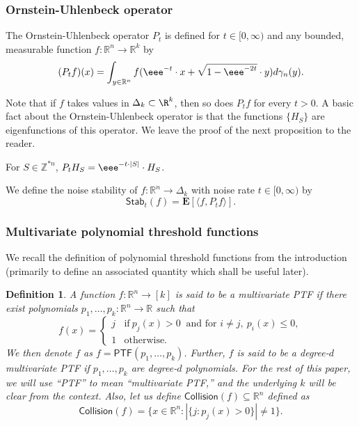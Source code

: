 \documentclass{toc}
\newtheorem*{definition*}{Definition}
\begin{document}
\subsubsection*{Ornstein-Uhlenbeck operator} 
\begin{definition}
The Ornstein-Uhlenbeck  operator $P_t$ is defined for $t \in [0, \infty)$ and any bounded, measurable function $f: \mathbb{R}^n \rightarrow \mathbb{R}^k$ by
$$
(P_t f)(x) = \int_{y \in \mathbb{R}^n} f(\eee^{-t} \cdot x + \sqrt{1- \eee^{-2t}} \cdot y) d \gamma_n(y).
$$
%
\end{definition}
Note that if $f$ takes values in $\Delta_k \subset \R^k$, then so does $P_t f$ for every $t>0$. 
A basic fact about  the Ornstein-Uhlenbeck operator is that the functions $\{H_S\}$ are eigenfunctions of this operator. We leave the proof of the next proposition to the reader. 
\begin{proposition}
For $S \in \mathbb{Z}^{\ast n}$,
$P_t H_S = \eee^{-t \cdot |S|} \cdot H_S$. 
\end{proposition}
We define the noise stability of $f: \mathbb{R}^n \rightarrow \Delta_k$ with noise rate $t \in [0, \infty)$ by
\[
\mathsf{Stab}_t(f)  = \mathbf{E}[\langle f , P_t f \rangle]. 
\]
\subsubsection*{Multivariate polynomial threshold functions}
We recall the definition of polynomial threshold functions from the introduction (primarily to define an associated quantity which shall be useful later). 
\begin{definition*}
A function $f: \mathbb{R}^n \rightarrow [k]$ is said to be a multivariate PTF if there exist polynomials $p_1, \ldots, p_k : \mathbb{R}^n \rightarrow \mathbb{R}$ such that 
$$
f(x) = \begin{cases}
j  & \textrm{if} \  p_j(x)>0 \ \textrm{ and  for } i \neq j, \  p_{i}(x) \le 0, \\
1 & \textrm{otherwise.}\end{cases}
$$
We then denote $f$ as $f = \mathsf{PTF}(p_1, \ldots, p_k)$. Further, $f$ is
said to be a degree-$d$ multivariate PTF if   $p_1, \ldots, p_k$ are  degree-$d$ polynomials. For the rest of this paper, we will use ``PTF'' to mean
``multivariate PTF,'' and the underlying $k$ will be clear from the context. Also, let
us define $\mathsf{Collision} (f ) \subseteq \mathbb{R}^n$ defined as 
\[
\mathsf{Collision} (f) = \big\{x \in \mathbb{R}^n: |\{ j: p_j (x) > 0\}| \neq 1 \big\}. 
\]
\end{definition*}
\end{document}
